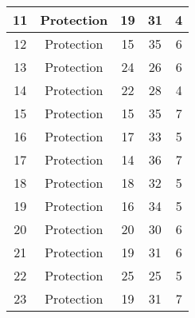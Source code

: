 \documentclass[results.tex]{subfiles}
\begin{document}
\begin{center}
\begin{tabular}{| c || c | c | c | c |}
            \hline
            11                      & Protection                   & 19                     & 31                      & 4                    \\
            \hline
            12                      & Protection                   & 15                     & 35                      & 6                    \\
            \hline
            13                      & Protection                   & 24                     & 26                      & 6                    \\
            \hline
            14                      & Protection                   & 22                     & 28                      & 4                    \\
            \hline
            15                      & Protection                   & 15                     & 35                      & 7                    \\
            \hline
            16                      & Protection                   & 17                     & 33                      & 5                    \\
            \hline
            17                      & Protection                   & 14                     & 36                      & 7                    \\
            \hline
            18                      & Protection                   & 18                     & 32                      & 5                    \\
            \hline
            19                      & Protection                   & 16                     & 34                      & 5                    \\
            \hline
            20                      & Protection                   & 20                     & 30                      & 6                    \\
            \hline
            21                      & Protection                   & 19                     & 31                      & 6                    \\
            \hline
            22                      & Protection                   & 25                     & 25                      & 5                    \\
            \hline
            23                      & Protection                   & 19                     & 31                      & 7                    \\

\end{tabular}
\end{center}
\end{document}
